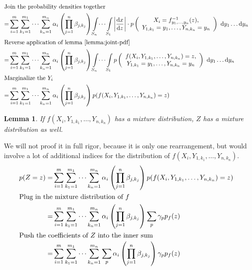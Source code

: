 \documentclass[11pt,a4paper]{book}
\newtheorem{lemma}{Lemma}
\newcommand{\ontopof}[2]{
  \begin{array}{c}
    #1,\\#2
  \end{array}
}
\begin{document}
\begin{proof2}
\begin{align*}
    \intertext{Join the probability densities together}
    = & \sum_{i = 1}^{m} \sum_{k_{1} = 1}^{m_{1}} \dots \sum_{k_{n} = 1}^{m_{n}} \alpha_{i} \left( \prod_{j = 1}^{n} \beta_{j,k_{j}} \right) \int\limits_{S_{n}} \dots \int\limits_{S_{1}} \left| \frac{\mathrm{d}x}{\mathrm{d}z} \right| \cdot p\left( \ontopof{X_{i} = f_{y_{1}, \dots, y_{n}}^{-1}(z)}{Y_{1,k_{1}} = y_{1}, \dots, Y_{n,k_{n}} = y_{n}} \right)~\mathrm{d}y_{1}\dots \mathrm{d}y_{n}\\
    \intertext{Reverse application of lemma \ref{lemma:joint-pdf}}
    = & \sum_{i = 1}^{m} \sum_{k_{1} = 1}^{m_{1}} \dots \sum_{k_{n} = 1}^{m_{n}} \alpha_{i} \left( \prod_{j = 1}^{n} \beta_{j,k_{j}} \right) \int\limits_{S_{n}} \dots \int\limits_{S_{1}} p\left( \ontopof{f(X_{i}, Y_{1,k_{1}}, \dots, Y_{n,k_{n}}) = z}{Y_{1,k_{1}} = y_{1}, \dots, Y_{n,k_{n}} = y_{n}} \right)~\mathrm{d}y_{1}\dots \mathrm{d}y_{n}\\
    \intertext{Marginalize the $Y_{i}$}
    = & \sum_{i = 1}^{m} \sum_{k_{1} = 1}^{m_{1}} \dots \sum_{k_{n} = 1}^{m_{n}} \alpha_{i} \left( \prod_{j = 1}^{n} \beta_{j,k_{j}} \right) p(f(X_{i}, Y_{1,k_{1}}, \dots, Y_{n,k_{n}}) = z)
  \end{align*}
\end{proof2}

\begin{lemma}
  \label{lemma:components}
  If $f(X_{i}, Y_{1,k_{1}}, \dots, Y_{n,k_{n}})$ has a mixture distribution, $Z$
  has a mixture distribution as well.
\end{lemma}
\begin{proof2}
  We will not proof it in full rigor, because it is only one rearrangement, but
  would involve a lot of additional indices for the distribution of
  $f(X_{i}, Y_{1,k_{1}}, \dots, Y_{n,k_{n}})$.
  \begin{align*}
    p(Z = z) = & \sum_{i = 1}^{m} \sum_{k_{1} = 1}^{m_{1}} \dots \sum_{k_{n} = 1}^{m_{n}} \alpha_{i} \left( \prod_{j = 1}^{n} \beta_{j,k_{j}} \right) p(f(X_{i}, Y_{1,k_{1}}, \dots, Y_{n,k_{n}}) = z)\\
    \intertext{Plug in the mixture distribution of $f$}
    = & \sum_{i = 1}^{m} \sum_{k_{1} = 1}^{m_{1}} \dots \sum_{k_{n} = 1}^{m_{n}} \alpha_{i} \left( \prod_{j = 1}^{n} \beta_{j,k_{j}} \right) \sum_{p} \gamma_{p} p_{f}(z)\\
    \intertext{Push the coefficients of $Z$ into the inner sum}
    = & \sum_{i = 1}^{m} \sum_{k_{1} = 1}^{m_{1}} \dots \sum_{k_{n} = 1}^{m_{n}} \sum_{p} \alpha_{i} \left( \prod_{j = 1}^{n} \beta_{j,k_{j}} \right) \gamma_{p} p_{f}(z)\\
  \end{align*}
\end{proof2}
\end{document}
